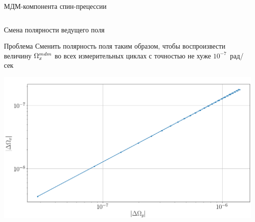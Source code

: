 \documentclass[14pt]{beamer}
\newcommand{\Wmdm}{\W^{mdm}}
\begin{document}
\begin{frame}{МДМ-компонента спин-прецессии}
\begin{columns}
\begin{column}{.5\linewidth}
	\end{column}
\end{columns}
\end{frame}
\begin{frame}{Смена полярности ведущего поля}\centering
	\begin{block}{Проблема}
		Сменить полярность поля таким образом, чтобы воспроизвести величину $\Wmdm_x$ во всех измерительных циклах с точностью не хуже $10^{-7}$~рад/сек
	\end{block}
		\includegraphics[width=.7\linewidth]{GFF/GFF_omegas_range_Y}
\end{frame}
\end{document}
